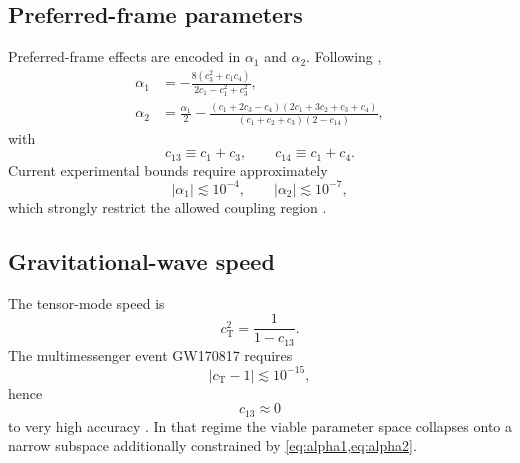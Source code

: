 \documentclass[12pt,a4paper]{article}
\newcommand{\cT}{c_{\mathrm{T}}}
\begin{document}
        \subsection{Preferred-frame parameters}
            
            Preferred-frame effects are encoded in $\alpha_1$ and $\alpha_2$. Following
            \citet{foster2006},
            \begin{align}
                \alpha_1 &=
                -\frac{8(c_3^2+c_1c_4)}
                {2c_1-c_1^2+c_3^2},
                \label{eq:alpha1}
                \\[4pt]
                \alpha_2 &=
                \frac{\alpha_1}{2}
                -\frac{(c_1+2c_3-c_4)(2c_1+3c_2+c_3+c_4)}
                {(c_1+c_2+c_3)(2-c_{14})},
                \label{eq:alpha2}
            \end{align}
            with
            \begin{equation}
                c_{13}\equiv c_1+c_3,
                \qquad
                c_{14}\equiv c_1+c_4.
            \end{equation}
            Current experimental bounds require approximately
            \begin{equation}
                |\alpha_1|\lesssim 10^{-4},
                \qquad
                |\alpha_2|\lesssim 10^{-7},
            \end{equation}
            which strongly restrict the allowed coupling region \citep{will2014}.
        
        \subsection{Gravitational-wave speed}
            
            The tensor-mode speed is
            \begin{equation}
                \cT^2 = \frac{1}{1-c_{13}}.
                \label{eq:cT}
            \end{equation}
            The multimessenger event GW170817 requires
            \begin{equation}
                |\cT-1|\lesssim 10^{-15},
            \end{equation}
            hence
            \begin{equation}
                c_{13}\approx 0
                \label{eq:c13constraint}
            \end{equation}
            to very high accuracy \citep{abbott2017gw,abbott2017mm}. In that regime the
            viable parameter space collapses onto a narrow subspace additionally constrained
            by \cref{eq:alpha1,eq:alpha2}.
    
\end{document}
